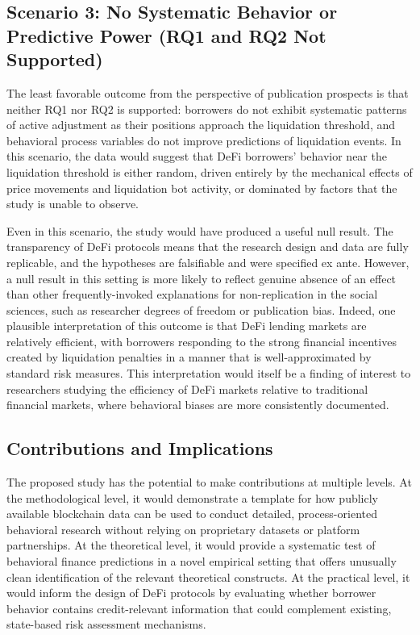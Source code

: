 \subsection{Scenario 3: No Systematic Behavior or Predictive Power (RQ1 and RQ2 Not Supported)}

The least favorable outcome from the perspective of publication prospects is that neither RQ1 nor RQ2 is supported: borrowers do not exhibit systematic patterns of active adjustment as their positions approach the liquidation threshold, and behavioral process variables do not improve predictions of liquidation events. In this scenario, the data would suggest that DeFi borrowers' behavior near the liquidation threshold is either random, driven entirely by the mechanical effects of price movements and liquidation bot activity, or dominated by factors that the study is unable to observe.

Even in this scenario, the study would have produced a useful null result. The transparency of DeFi protocols means that the research design and data are fully replicable, and the hypotheses are falsifiable and were specified ex ante. However, a null result in this setting is more likely to reflect genuine absence of an effect than other frequently-invoked explanations for non-replication in the social sciences, such as researcher degrees of freedom or publication bias. Indeed, one plausible interpretation of this outcome is that DeFi lending markets are relatively efficient, with borrowers responding to the strong financial incentives created by liquidation penalties in a manner that is well-approximated by standard risk measures. This interpretation would itself be a finding of interest to researchers studying the efficiency of DeFi markets relative to traditional financial markets, where behavioral biases are more consistently documented.

\subsection{Contributions and Implications}

The proposed study has the potential to make contributions at multiple levels. At the methodological level, it would demonstrate a template for how publicly available blockchain data can be used to conduct detailed, process-oriented behavioral research without relying on proprietary datasets or platform partnerships. At the theoretical level, it would provide a systematic test of behavioral finance predictions in a novel empirical setting that offers unusually clean identification of the relevant theoretical constructs. At the practical level, it would inform the design of DeFi protocols by evaluating whether borrower behavior contains credit-relevant information that could complement existing, state-based risk assessment mechanisms.

